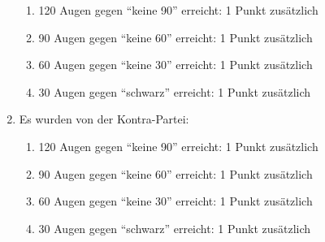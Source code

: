\documentclass{scrartcl}
\begin{document}
\begin{enumerate}
    \begin{enumerate}
      \item 120 Augen gegen "`keine 90"' erreicht: 1 Punkt zusätzlich
      \item 90 Augen gegen "`keine 60"' erreicht: 1 Punkt zusätzlich
      \item 60 Augen gegen "`keine 30"' erreicht: 1 Punkt zusätzlich
      \item 30 Augen gegen "`schwarz"' erreicht: 1 Punkt zusätzlich
    \end{enumerate}
  \item Es wurden von der Kontra-Partei:
    \begin{enumerate}
      \item 120 Augen gegen "`keine 90"' erreicht: 1 Punkt zusätzlich
      \item 90 Augen gegen "`keine 60"' erreicht: 1 Punkt zusätzlich
      \item 60 Augen gegen "`keine 30"' erreicht: 1 Punkt zusätzlich
      \item 30 Augen gegen "`schwarz"' erreicht: 1 Punkt zusätzlich
    \end{enumerate}
\end{enumerate}
\end{document}
